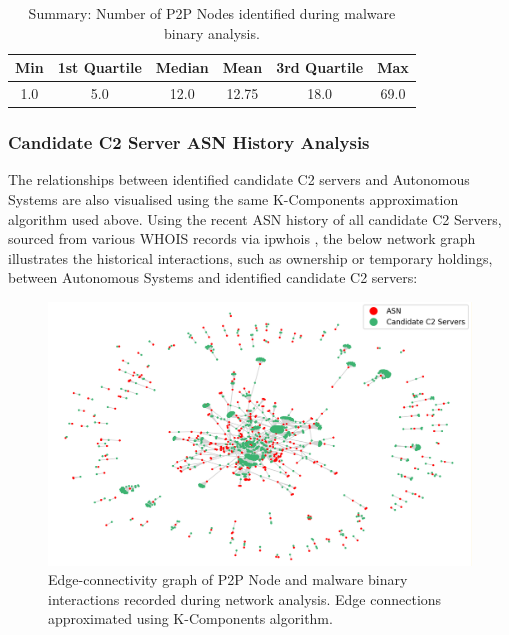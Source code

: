\begin{table}[!htb]
    \centering
    \caption{Summary: Number of P2P Nodes identified during malware binary analysis.}
    \label{tab:p2p_payload_summary}
    \begin{tabular}{|c|c|c|c|c|c|}
    \hline
    \textbf{Min} & \textbf{1st Quartile} & \textbf{Median} & \textbf{Mean} & \textbf{3rd Quartile} & \textbf{Max} \\ \hline
    1.0 & 5.0 & 12.0 & 12.75 & 18.0 & 69.0 \\ \hline
    \end{tabular}
\end{table}

\subsubsection{Candidate C2 Server ASN History Analysis} The relationships between identified candidate C2 servers and Autonomous Systems are also visualised using the same K-Components approximation algorithm used above. Using  the recent ASN history of all candidate C2 Servers, sourced from various WHOIS records via ipwhois \citep{ipwhois}, the below network graph illustrates the historical interactions, such as ownership or temporary holdings, between Autonomous Systems and identified candidate C2 servers:

\begin{figure}[!htb]
    \centering
    \includegraphics[width=0.9\linewidth]{results/c2_asn_network.png}
    \caption{Edge-connectivity graph of P2P Node and malware binary interactions recorded during network analysis. Edge connections approximated using K-Components algorithm.}
    \label{fig:c2_asn_networks} 
\end{figure}

